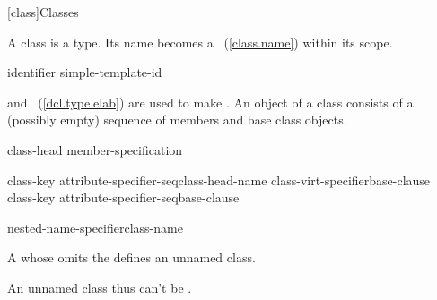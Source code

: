 [class]{Classes}%



\pnum
{}%
%
%
%
A class is a type.
%
Its name becomes a ~(\ref{class.name}) within its
scope.

\begin{bnf}
\br
    identifier\br
    simple-template-id
\end{bnf}

 and
~(\ref{dcl.type.elab}) are used to
make . An object of a class consists of a
(possibly empty) sequence of members and base class objects.

\begin{bnf}
\br
    class-head \terminal{\{} member-specification\opt{} \terminal{\}}
\end{bnf}

\begin{bnf}
\br
    class-key attribute-specifier-seq\opt class-head-name class-virt-specifier\opt base-clause\opt\br
    class-key attribute-specifier-seq\opt base-clause\opt
\end{bnf}

\begin{bnf}
\br
    nested-name-specifier\opt class-name
\end{bnf}

\begin{bnf}
\br
\end{bnf}

\begin{bnf}
\br
    \br
    \br
\end{bnf}

A  whose
 omits the
 defines an unnamed class. \begin{note} An unnamed class thus can't
be . \end{note}

